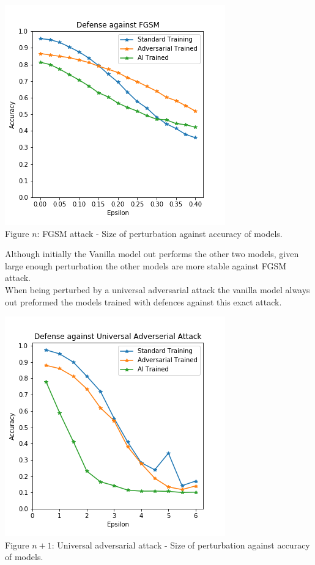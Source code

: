 \begin{center}
	\includegraphics[scale=0.5]{Advsarial_code/figures/doc_defense_against_FGSM.png}\\
	Figure $n$: FGSM attack - Size of perturbation against accuracy of models. 
\end{center}

Although initially the Vanilla model out performs the other two models, given large enough perturbation the other models are more stable against FGSM attack.\\ 

When being perturbed by a universal adversarial attack the vanilla model always out preformed the models trained with defences against this exact attack. 

\begin{center}
	\includegraphics[scale=0.5]{Advsarial_code/figures/doc_defense_against_UAA.png}\\
	Figure $n + 1$: Universal adversarial attack - Size of perturbation against accuracy of models.
\end{center}


